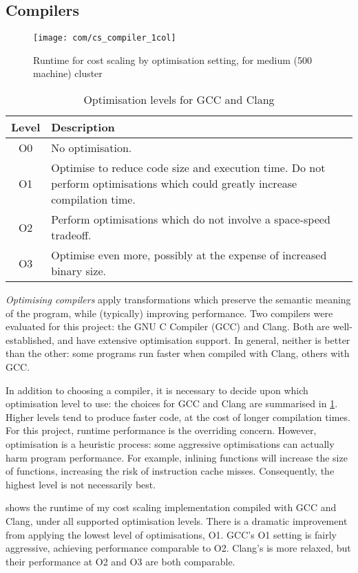 \subsection{Compilers} \label{sec:eval-optimisations-compilers}

\begin{figure}
    \texttt{[image: com/cs\_compiler\_1col]}
    \caption{Runtime for cost scaling by optimisation setting, for medium (500 machine) cluster}
    \label{fig:compiler-settings}
\end{figure}

\begin{table}
    \centering
    \begin{tabular}{c|p{}}
        \textbf{Level} & \textbf{Description}\tabularnewline
        \hline
        O0 & No optimisation. \tabularnewline
        O1 & Optimise to reduce code size and execution time. Do not perform optimisations which could greatly increase compilation time. \tabularnewline
        O2 & Perform optimisations which do not involve a space-speed tradeoff. \tabularnewline 
        O3 & Optimise even more, possibly at the expense of increased binary size. \tabularnewline
        \hline
    \end{tabular}
    \caption{Optimisation levels for GCC and Clang}
    \label{table:optimisation-flags}
\end{table}

\emph{Optimising compilers} apply transformations which preserve the semantic meaning of the program, while (typically) improving performance. Two compilers were evaluated for this project: the GNU C Compiler (GCC) and Clang. Both are well-established, and have extensive optimisation support. In general, neither is better than the other: some programs run faster when compiled with Clang, others with GCC.

In addition to choosing a compiler, it is necessary to decide upon which optimisation level to use: the choices for GCC and Clang are summarised in \cref{table:optimisation-flags}. Higher levels tend to produce faster code, at the cost of longer compilation times. For this project, runtime performance is the overriding concern. However, optimisation is a heuristic process: some aggressive optimisations can actually harm program performance. For example, inlining functions will increase the size of functions, increasing the risk of instruction cache misses. Consequently, the highest level is not necessarily best.

 shows the runtime of my cost scaling implementation compiled with GCC and Clang, under all supported optimisation levels. There is a dramatic improvement from applying the lowest level of optimisations, O1. GCC's O1 setting is fairly aggressive, achieving performance comparable to O2. Clang's is more relaxed, but their performance at O2 and O3 are both comparable.

